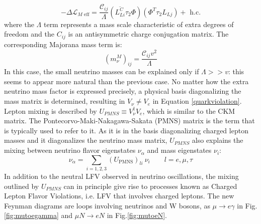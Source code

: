 \begin{equation}
-\Delta \mathscr{L}_{M \text { eff}}=\frac{\mathcal{C}_{i j}}{\Lambda}\left(\overline{L_{L i}^C} \tau_2 \Phi\right)\left(\Phi^T \tau_2 L_{L j}\right)+\text { h.c.}
\end{equation}
where the $\Lambda$ term represents a mass scale characteristic of extra degrees of freedom and the $C_{ij}$ is an antisymmetric charge conjugation matrix. The corresponding Majorana mass term is:
\begin{equation}
\left(m_\nu^M\right)_{i j}=\frac{\mathcal{C}_{i j} v^2}{\Lambda}
\end{equation}
In this case, the small neutrino masses can be explained only if $\Lambda > > v$: this seems to appear more natural than the previous case. No matter how the extra neutrino mass factor is expressed precisely, a physical basis diagonalizing the mass matrix is determined, resulting in $V_{\nu} \neq V_e$ in Equation \ref{quarkviolation}. Lepton mixing is described by $U_{PMNS} \equiv V_{\nu}^{\dagger} V_e$, which is similar to the CKM matrix. The Pontecorvo-Maki-Nakagawa-Sakata (PMNS) matrix is the term that is typically used to refer to it. As it is in the basis diagonalizing charged lepton masses and it diagonalizes the neutrino mass matrix, $U_{PMNS}$ also explains the mixing between neutrino flavor eigenstates $\nu_{\alpha}$ and mass eigenstates $\nu_i$:
\begin{equation}
\nu_\alpha=\sum_{i=1,2,3}\left(U_{\mathrm{PMNS}}\right)_{l i} \ \nu_i \qquad l=e, \mu, \tau
\end{equation}
In addition to the neutral LFV observed in neutrino oscillations, the mixing outlined by $U_{PMNS}$ can in principle give rise to processes known as Charged Lepton Flavor Violations, i.e. LFV that involves charged leptons. The new Feynman diagrams are loops involving neutrinos and W bosons, as $\mu \rightarrow e \gamma$ in Fig.\ref{fig:mutoegamma} and $\mu N \rightarrow e N$ in Fig.\ref{fig:mutoeN}. 



